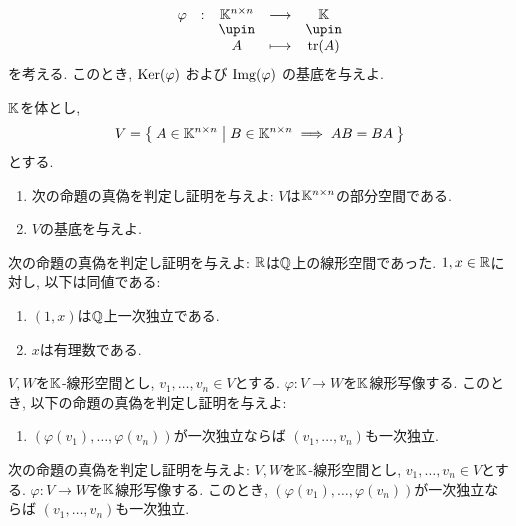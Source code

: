 \begin{quiz}
  \begin{align*}
    \shazo{\varphi}{\KK^{n\times n}}{\KK}
    {A}{\tr(A)}
  \end{align*}
  を考える.
  このとき,
  $\operatorname{Ker}(\varphi)$
  および
  $\operatorname{Img}(\varphi)$
  の基底を与えよ.
\end{quiz}

\begin{quiz}
  $\mathbb{K}$を体とし,
  \begin{align*}
    V=
    \Set{A\in\mathbb{K}^{n\times n} | B\in \mathbb{K}^{n\times n} \implies AB=BA}
  \end{align*}
  とする.
  \begin{enumerate}
  \item
    次の命題の真偽を判定し証明を与えよ:
    $V$は$\mathbb{K}^{n\times n}$の部分空間である.
  \item
    $V$の基底を与えよ.
  \end{enumerate}
\end{quiz}

\begin{quiz}
  次の命題の真偽を判定し証明を与えよ:
  $\mathbb{R}$は$\mathbb{Q}$上の線形空間であった.
  $1,x\in\mathbb{R}$に対し, 以下は同値である:
  \begin{enumerate}
  \item $(1,x)$は$\mathbb{Q}$上一次独立である.
  \item $x$は有理数である.
  \end{enumerate}
\end{quiz}


\begin{quiz}
  $V,W$を$\mathbb{K}$-線形空間とし,
  $v_1,\ldots,v_n\in V$とする.
  $\varphi\colon V\to W$を$\mathbb{K}$線形写像する.
  このとき,
  以下の命題の真偽を判定し証明を与えよ:
  \begin{enumerate}
  \item    
    $(\varphi(v_1),\ldots,\varphi(v_n))$が一次独立ならば
    $(v_1,\ldots,v_n)$も一次独立.
  \end{enumerate}
\end{quiz}

\begin{quiz}
  次の命題の真偽を判定し証明を与えよ:
  $V,W$を$\mathbb{K}$-線形空間とし,
  $v_1,\ldots,v_n\in V$とする.
  $\varphi\colon V\to W$を$\mathbb{K}$線形写像する.
  このとき,
  $(\varphi(v_1),\ldots,\varphi(v_n))$が一次独立ならば
  $(v_1,\ldots,v_n)$も一次独立.
\end{quiz}

